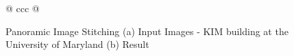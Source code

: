 \documentclass{article}
\begin{document}
\begin{figure}[p]
\begin{center}
\begin{tabular}{@{} ccc @{}}
      \\
    \end{tabular}
    \caption{
      Panoramic Image Stitching
      (a) Input Images - KIM building at the University of Maryland
      (b) Result
    } 
    \label{Fi:Panorama}
  \end{center}
\end{figure} 
\end{document}
